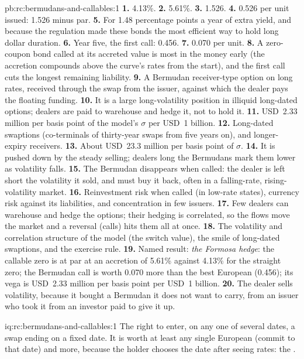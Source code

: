\begin{solution}{pb:rc:bermudans-and-callables:1}
\textbf{1.} 4.13\%.
\textbf{2.} 5.61\%.
\textbf{3.} 1.526.
\textbf{4.} 0.526 per unit issued: 1.526 minus par.
\textbf{5.} For 1.48 percentage points a year of extra yield, and because the regulation
made these bonds the most efficient way to hold long dollar duration.
\textbf{6.} Year five, the first call: 0.456.
\textbf{7.} 0.070 per unit.
\textbf{8.} A zero-coupon bond called at its accreted value is most in the money early
(the accretion compounds above the curve's rates from the start), and the first
call cuts the longest remaining liability.
\textbf{9.} A Bermudan receiver-type option on long rates, received through the swap
from the issuer, against which the dealer pays the floating funding.
\textbf{10.} It is a large long-volatility position in illiquid long-dated options;
dealers are paid to warehouse and hedge it, not to hold it.
\textbf{11.} USD~2.33 million per basis point of the model's $\sigma$ per USD~1 billion.
\textbf{12.} Long-dated swaptions (co-terminals of thirty-year swaps from five years
on), and longer-expiry receivers.
\textbf{13.} About USD~23.3 million per basis point of $\sigma$.
\textbf{14.} It is pushed down by the steady selling; dealers long the Bermudans mark
them lower as volatility falls.
\textbf{15.} The Bermudan disappears when called: the dealer is left short the
volatility it sold, and must buy it back, often in a falling-rate, rising-volatility
market.
\textbf{16.} Reinvestment risk when called (in low-rate states), currency risk against
its liabilities, and concentration in few issuers.
\textbf{17.} Few dealers can warehouse and hedge the options; their hedging is
correlated, so the flows move the market and a reversal (calls) hits them all at
once.
\textbf{18.} The volatility and correlation structure of the model (the switch value),
the smile of long-dated swaptions, and the exercise rule.
\textbf{19.} Named result: \emph{the Formosa hedge}: the callable zero is at par at an
accretion of 5.61\% against 4.13\% for the straight zero; the Bermudan call is worth
0.070 more than the best European (0.456); its vega is USD~2.33 million per basis
point per USD~1 billion.
\textbf{20.} The dealer sells volatility, because it bought a Bermudan it does not
want to carry, from an issuer who took it from an investor paid to give it up.
\end{solution}

\begin{solution}{iq:rc:bermudans-and-callables:1}
The right to enter, on any one of several dates, a swap ending on a fixed date. It
is worth at least any single European (commit to that date) and more, because the
holder chooses the date after seeing rates: the .
\end{solution}

